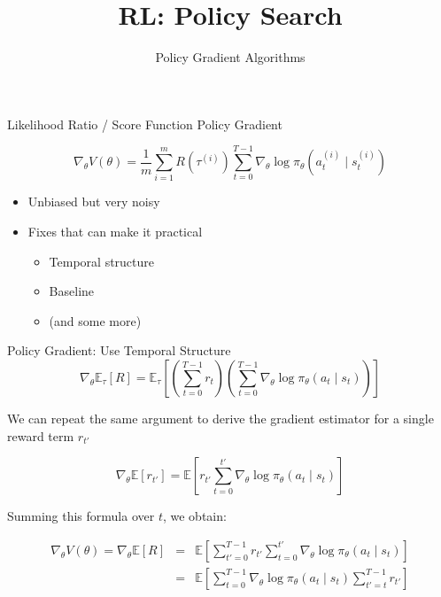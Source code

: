\documentclass[aspectratio=169]{../latex_main/tntbeamer}  %
\title[RL: Policy Gradient]{RL: Policy Search}
\subtitle{Policy Gradient Algorithms}
\begin{document}
	
	\maketitle

\begin{frame}[c]{Likelihood Ratio / Score Function Policy Gradient}
	
	
	$$\nabla_\theta V(\theta) = \frac{1}{m} \sum_{i=1}^{m} R(\tau^{(i)}) \sum_{t=0}^{T-1} \nabla_\theta \log \pi_\theta (a_t^{(i)} \mid s_t^{(i)}) $$
	
	\begin{itemize}
		\item Unbiased but very noisy
		\item Fixes that can make it practical
		\begin{itemize}
			\item Temporal structure
			\item Baseline
			\item (and some more)
		\end{itemize}
		
	\end{itemize}
	
\end{frame}
\begin{frame}[c]{Policy Gradient: Use Temporal Structure}
\vspace{-1.5em}
$$ \nabla_\theta \mathbb{E}_\tau [R] = \mathbb{E}_\tau \left[ \left(\sum_{t=0}^{T-1} r_t\right) \left( \sum_{t=0}^{T-1} \nabla_\theta \log \pi_\theta(a_t \mid s_t) \right) \right]$$
	
We can repeat the same argument to derive the gradient estimator for a single reward term $r_{t'}$

$$\nabla_\theta \mathbb{E} [r_{t'}] = \mathbb{E} \left[r_{t'} \sum_{t=0}^{t'} \nabla_\theta \log \pi_\theta (a_t \mid s_t)\right] $$
	
Summing this formula over $t$, we obtain:

\begin{eqnarray}
\nabla_\theta V(\theta) = \nabla_\theta \mathbb{E}[R] &=& \mathbb{E} \left[ \sum_{t'=0}^{T-1} r_{t'} \sum^{t'}_{t=0} \nabla_\theta \log \pi_\theta (a_t \mid s_t)  \right]\nonumber\\
&=& \mathbb{E} \left[ \sum_{t=0}^{T-1}  \nabla_\theta \log \pi_\theta (a_t \mid s_t)   \sum^{T-1}_{t'=t} r_{t'}  \right]\nonumber
\end{eqnarray}

	
\end{frame}
\end{document}
